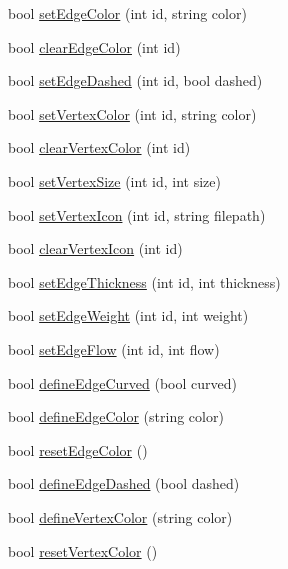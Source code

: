 \begin{DoxyCompactItemize}
\item 
bool \hyperlink{classGraphViewer_a07ccc96707efae4aa5f3ced3dca015af}{set\+Edge\+Color} (int id, string color)
\item 
bool \hyperlink{classGraphViewer_a0e3bb8f6d7290e141c141ca83c9eb67a}{clear\+Edge\+Color} (int id)
\item 
bool \hyperlink{classGraphViewer_a1698f1c6b3a8e7cabc7b7d7cf42fc7f0}{set\+Edge\+Dashed} (int id, bool dashed)
\item 
bool \hyperlink{classGraphViewer_a8b542d7e09e81a45a74760c19233beb0}{set\+Vertex\+Color} (int id, string color)
\item 
bool \hyperlink{classGraphViewer_a70e2f6cc24e545a66312a92cf5839d25}{clear\+Vertex\+Color} (int id)
\item 
bool \hyperlink{classGraphViewer_ae930dfdfcdeb7a871eefb6028d74b9f9}{set\+Vertex\+Size} (int id, int size)
\item 
bool \hyperlink{classGraphViewer_a02d5f7393eab9a2d1b66719039597a64}{set\+Vertex\+Icon} (int id, string filepath)
\item 
bool \hyperlink{classGraphViewer_aecbeec01205b7f93cf73a65282f2daba}{clear\+Vertex\+Icon} (int id)
\item 
bool \hyperlink{classGraphViewer_a07f598272fe3515455eab13be749604a}{set\+Edge\+Thickness} (int id, int thickness)
\item 
bool \hyperlink{classGraphViewer_ac211de009a0afe2e6d44f4f8d030a2cc}{set\+Edge\+Weight} (int id, int weight)
\item 
bool \hyperlink{classGraphViewer_a69eb065145063e4dea41961e92e35c8e}{set\+Edge\+Flow} (int id, int flow)
\item 
bool \hyperlink{classGraphViewer_a08f362be0e682d91e7506dca8caae1b8}{define\+Edge\+Curved} (bool curved)
\item 
bool \hyperlink{classGraphViewer_a4102580b69826ba83251ef7bb262f8be}{define\+Edge\+Color} (string color)
\item 
bool \hyperlink{classGraphViewer_a1df1a30f4668bf70364fac232f8d0600}{reset\+Edge\+Color} ()
\item 
bool \hyperlink{classGraphViewer_af785279b5c204df0e274b20c36276fc3}{define\+Edge\+Dashed} (bool dashed)
\item 
bool \hyperlink{classGraphViewer_a76de8676b7a93d72af514b84cdaa4d21}{define\+Vertex\+Color} (string color)
\item 
bool \hyperlink{classGraphViewer_acd95eee309d5e9b1935ec39c5ed45cac}{reset\+Vertex\+Color} ()
\item 

\end{DoxyCompactItemize}
